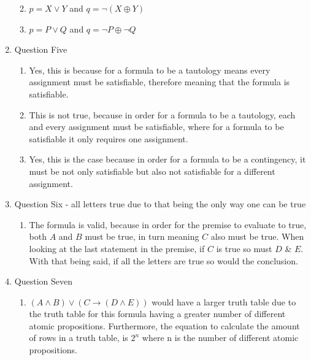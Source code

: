 \documentclass{article}
\begin{document}
\begin{enumerate}
\begin{enumerate}
\begin{tabular}{c}
        \end{tabular}
        \item $p = X \lor Y$ and $q = \neg (X \oplus Y)$
        \item $p = P \lor Q$ and $q = \neg P \oplus \neg Q$
    \end{enumerate}
    \item Question Five
    \begin{enumerate}
        \item Yes, this is because for a formula to be a tautology means every assignment must be satisfiable, therefore meaning that the formula is satisfiable.
        \item This is not true, because in order for a formula to be a tautology, each and every assignment must be satisfiable, where for a formula to be satisfiable it only requires one assignment.
        \item Yes, this is the case because in order for a formula to be a contingency, it must be not only satisfiable but also not satisfiable for a different assignment.
    \end{enumerate}
    \item Question Six - all letters true due to that being the only way one can be true
    \begin{enumerate}
        \item The formula is valid, because in order for the premise to evaluate to true, both $A$ and $B$ must be true, in turn meaning $C$ also must be true. When looking at the last statement in the premise, if $C$ is true so must $D$ \& $E$. With that being said, if all the letters are true so would the conclusion.
    \end{enumerate}
    \item Question Seven
    \begin{enumerate}
        \item $(A \land B) \lor (C \rightarrow (D \land E))$ would have a larger truth table due to the truth table for this formula having a greater number of different atomic propositions. Furthermore, the equation to calculate the amount of rows in a truth table, is $2^n$ where n is the number of different atomic propositions.
    \end{enumerate}
\end{enumerate}
\end{document}
